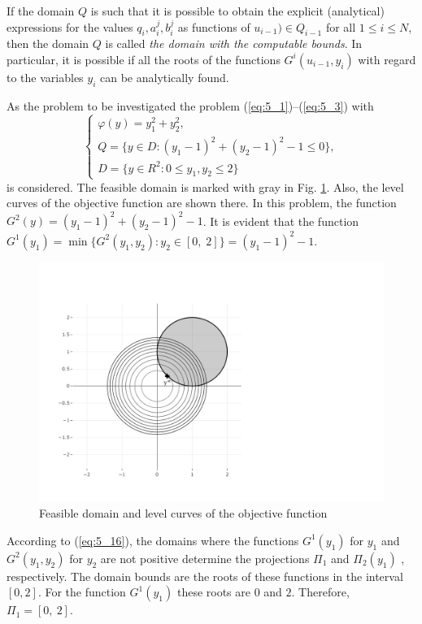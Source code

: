 If the domain $Q$  is such that it is possible to obtain the explicit (analytical) expressions for the values $q_i,a_i^j,b_i^j$   as  functions of $u_{i-1})\in Q_{i-1}$  for all $1\leq i\leq N$, then the domain $Q$ is called \textit{the domain with the computable bounds}. In particular, it is possible if all the roots of the functions $G^i(u_{i-1},y_i)$  with regard to the variables $y_i$  can be analytically found.
\begin{example}
\label {exam:5_1}
As the problem to be investigated  the problem (\ref{eq:5_1})--(\ref{eq:5_3}) with 
\begin{equation}
\label{eq:5_26}
  \begin{cases}
    \varphi(y)=y_1^2+y_2^2,\\
   Q=\{y\in D:(y_1-1)^2+(y_2-1)^2-1\leq 0\}, \\
	D=\{y\in R^2:0\leq y_1,y_2\leq 2\}
  \end{cases}
\end{equation}
is considered. The feasible domain is marked with gray in Fig. \ref{fig:5_4}. Also, the level curves of the objective function are shown there. In this problem, the function $G^2(y)=(y_1-1)^2+(y_2-1)^2-1$. It is evident that the function  $G^1(y_1)=\min\{G^2(y_1,y_2):y_2\in [0,\;2]\}=(y_1-1)^2-1$. 
\begin{figure}[t]
\centering
\includegraphics[width=1.1\linewidth]{figures/figure_5_4.pdf}
\caption{Feasible domain and level curves of the objective function}
\label{fig:5_4}    
\end{figure}

According to (\ref{eq:5_16}), the domains where the functions $G^1(y_1)$  for $y_1$  and $G^2(y_1,y_2)$  for $y_2$  are not positive determine the projections $\Pi_1$  and $\Pi_2(y_1)$ , respectively. The domain bounds are the roots of these functions in the interval $[0,2]$. For the function $G^1(y_1)$  these roots are $0$ and $2$. Therefore, $\Pi_1=[0,\:2]$.


\end{example}

